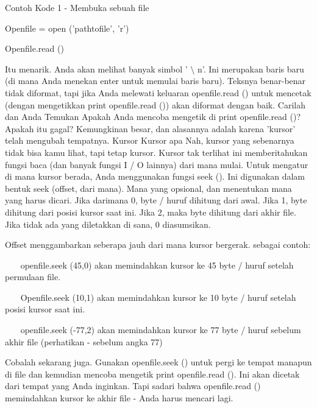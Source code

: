 \noindent 
Contoh Kode 1 - Membuka sebuah file \par
\vspace{12pt}
\noindent 
Openfile = open ('pathtofile', 'r') \par
\noindent 
Openfile.read () \par
\vspace{12pt}
Itu menarik. Anda akan melihat banyak simbol ' $  \setminus  $ n'. Ini merupakan baris baru (di mana Anda menekan enter untuk memulai baris baru). Teksnya benar-benar tidak diformat, tapi jika Anda melewati keluaran openfile.read () untuk mencetak (dengan mengetikkan print openfile.read ()) akan diformat dengan baik. Carilah dan Anda Temukan Apakah Anda mencoba mengetik di print openfile.read ()? Apakah itu gagal? Kemungkinan besar, dan alasannya adalah karena 'kursor' telah mengubah tempatnya. Kursor Kursor apa Nah, kursor yang sebenarnya tidak bisa kamu lihat, tapi tetap kursor. Kursor tak terlihat ini memberitahukan fungsi baca (dan banyak fungsi I / O lainnya) dari mana mulai. Untuk mengatur di mana kursor berada, Anda menggunakan fungsi seek (). Ini digunakan dalam bentuk seek (offset, dari mana). Mana yang opsional, dan menentukan mana yang harus dicari. Jika darimana 0, byte / huruf dihitung dari awal. Jika 1, byte dihitung dari posisi kursor saat ini. Jika 2, maka byte dihitung dari akhir file. Jika tidak ada yang diletakkan di sana, 0 diasumsikan. \par
\vspace{12pt}
\noindent 
Offset menggambarkan seberapa jauh dari mana kursor bergerak. sebagai contoh: \par
\vspace{12pt}
\noindent 
~~~ openfile.seek (45,0) akan memindahkan kursor ke 45 byte / huruf setelah permulaan file. \par
\noindent 
~~~ Openfile.seek (10,1) akan memindahkan kursor ke 10 byte / huruf setelah posisi kursor saat ini. \par
\noindent 
~~~ openfile.seek (-77,2) akan memindahkan kursor ke 77 byte / huruf sebelum akhir file (perhatikan - sebelum angka 77) \par
\vspace{12pt}
Cobalah sekarang juga. Gunakan openfile.seek () untuk pergi ke tempat manapun di file dan kemudian mencoba mengetik print openfile.read (). Ini akan dicetak dari tempat yang Anda inginkan. Tapi sadari bahwa openfile.read () memindahkan kursor ke akhir file - Anda harus mencari lagi. \par
\vspace{12pt}
